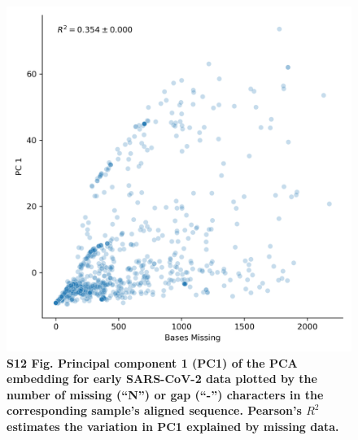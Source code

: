 \documentclass[10pt,letterpaper]{article}
\begin{document}
\begin{figure}[!h]
\includegraphics[width=\columnwidth]{figures/sarscov2-pc1-vs-bases-missing.png}
\caption*{{\bf S12 Fig. Principal component 1 (PC1) of the PCA embedding for early SARS-CoV-2 data plotted by the number of missing (``N'') or gap (``-'') characters in the corresponding sample's aligned sequence. Pearson's $R^{2}$ estimates the variation in PC1 explained by missing data.}}
\end{figure}
\end{document}
